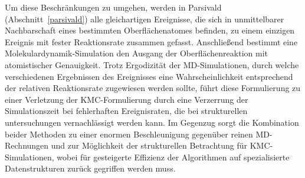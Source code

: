 Um diese Beschränkungen zu umgehen, werden in Parsivald (Abschnitt~\ref{parsivald}) alle gleichartigen Ereignisse, die sich in unmittelbarer Nachbarschaft eines bestimmten Oberflächenatomes befinden, zu einem einzigen Ereignis mit fester Reaktionsrate zusammen gefasst.
Anschließend bestimmt eine Molekulardynamik-Simulation den Ausgang der Oberflächenreaktion mit atomistischer Genauigkeit.
Trotz Ergodizität der MD-Simulationen, durch welche verschiedenen Ergebnissen des Ereignisses eine Wahrscheinlichkeit entsprechend der relativen Reaktionsrate zugewiesen werden sollte, führt diese Formulierung zu einer Verletzung der KMC-Formulierung durch eine Verzerrung der Simulationszeit bei fehlerhaften Ereignisraten, die bei strukturellen untersuchungen vernachlässigt werden kann.
Im Gegenzug sorgt die Kombination beider Methoden zu einer enormen Beschleunigung gegenüber reinen MD-Rechnungen und zur Möglichkeit der strukturellen Betrachtung für KMC-Simulationen, wobei für gesteigerte Effizienz der Algorithmen auf spezialisierte Datenstrukturen zurück gegriffen werden muss.
